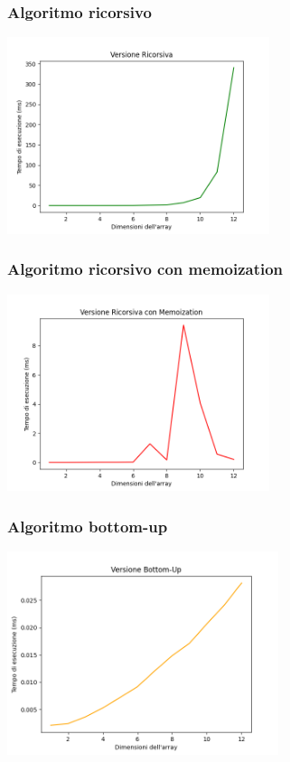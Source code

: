 \documentclass{article}
\begin{document}
\subsubsection{Algoritmo ricorsivo}
\begin{center}
    \includegraphics[width=290px]{plots/Ricorsiva.png}
\end{center}

\subsubsection{Algoritmo ricorsivo con memoization}
\begin{center}
    \includegraphics[width=290px]{plots/Memoization.png}
\end{center}

\subsubsection{Algoritmo bottom-up}
\begin{center}
    \includegraphics[width=300px]{plots/Bottom-Up.png}
\end{center}
\end{document}
